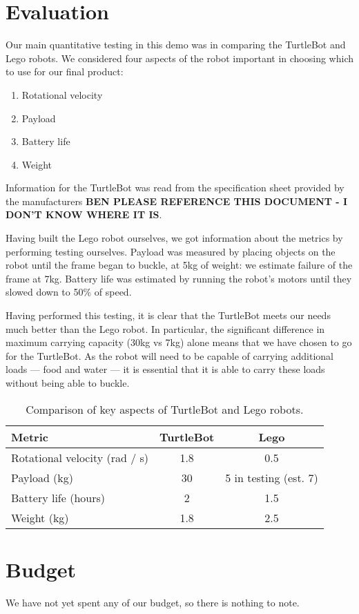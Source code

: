\documentclass{article}
\begin{document}
\section{Evaluation}
Our main quantitative testing in this demo was in comparing the TurtleBot and Lego robots. We considered four aspects of the robot important in choosing which to use for our final product:
\begin{enumerate}
\item Rotational velocity
\item Payload
\item Battery life
\item Weight
\end{enumerate}

Information for the TurtleBot was read from the specification sheet provided by the manufacturers {\bf BEN PLEASE REFERENCE THIS DOCUMENT - I DON'T KNOW WHERE IT IS}.

Having built the Lego robot ourselves, we got information about the metrics by performing testing ourselves. Payload was measured by placing objects on the robot until the frame began to buckle, at 5kg of weight: we estimate failure of the frame at 7kg. Battery life was estimated by running the robot's motors until they slowed down to 50\% of speed. 

Having performed this testing, it is clear that the TurtleBot meets our needs much better than the Lego robot. In particular, the significant difference in maximum carrying capacity (30kg vs 7kg) alone means that we have chosen to go for the TurtleBot. As the robot will need to be capable of carrying additional loads --- food and water --- it is essential that it is able to carry these loads without being able to buckle.


\begin{table}[h]
\vskip 3mm
\begin{center}
\begin{small}
\begin{sc}
\begin{tabular}{lcc}
\hline
\abovespace\belowspace
Metric & TurtleBot & Lego \\
\hline
  Rotational velocity (rad / s) & 1.8 & 0.5 \\
  Payload (kg) & 30 & 5 in testing (est. 7) \\
  Battery life (hours) & 2 & 1.5 \\
  Weight (kg) & 1.8 & 2.5 
\end{tabular}
\end{sc}
\end{small}
\caption{Comparison of key aspects of TurtleBot and Lego robots.}
\label{tab:sample-table}
\end{center}
\vskip -3mm
\end{table}


\section{Budget}
We have not yet spent any of our budget, so there is nothing to note. 



\end{document}
